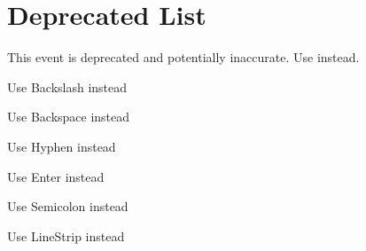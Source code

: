 \chapter{Deprecated List}
\hypertarget{deprecated}{}\label{deprecated}

\begin{DoxyRefList}
\item[Struct \doxylink{structsf_1_1_event_1_1_mouse_wheel_event}{sf\+::Event\+::Mouse\+Wheel\+Event} ]\label{deprecated__deprecated000018}%
%
This event is deprecated and potentially inaccurate. Use  instead. 
\item[Member \doxylink{classsf_1_1_keyboard_acb4cacd7cc5802dec45724cf3314a142a536df84e73859aa44e11e192459470b6}{sf\+::Keyboard\+::Back\+Slash} ]\label{deprecated__deprecated000021}%
%
Use Backslash instead  
\item[Member \doxylink{classsf_1_1_keyboard_acb4cacd7cc5802dec45724cf3314a142a33aeaab900abcd01eebf2fcc4f6d97e2}{sf\+::Keyboard\+::Back\+Space} ]\label{deprecated__deprecated000020}%
%
Use Backspace instead  
\item[Member \doxylink{classsf_1_1_keyboard_acb4cacd7cc5802dec45724cf3314a142a401a183dcfde0a06cb60fe6c91fa1e39}{sf\+::Keyboard\+::Dash} ]\label{deprecated__deprecated000019}%
%
Use Hyphen instead  
\item[Member \doxylink{classsf_1_1_keyboard_acb4cacd7cc5802dec45724cf3314a142ac291de81bdee518d636bc359f2ca77de}{sf\+::Keyboard\+::Return} ]\label{deprecated__deprecated000023}%
%
Use Enter instead  
\item[Member \doxylink{classsf_1_1_keyboard_acb4cacd7cc5802dec45724cf3314a142a460ab09a36f9ed230504b89b9815de88}{sf\+::Keyboard\+::Semi\+Colon} ]\label{deprecated__deprecated000022}%
%
Use Semicolon instead  
\item[Member \doxylink{group__graphics_gga5ee56ac1339984909610713096283b1ba5b09910f5d0f39641342184ccd0d1de3}{sf\+::Lines\+Strip} ]\label{deprecated__deprecated000001}%
%
Use Line\+Strip instead  
\item[Member \doxylink{classsf_1_1_render_texture_aaec1fb8ee77844da50b0143cb41c8a71}{sf\+::Render\+Texture\+::create} (unsigned int width, unsigned int height, bool depth\+Buffer)]\label{deprecated__deprecated000004}%

\end{DoxyRefList}
